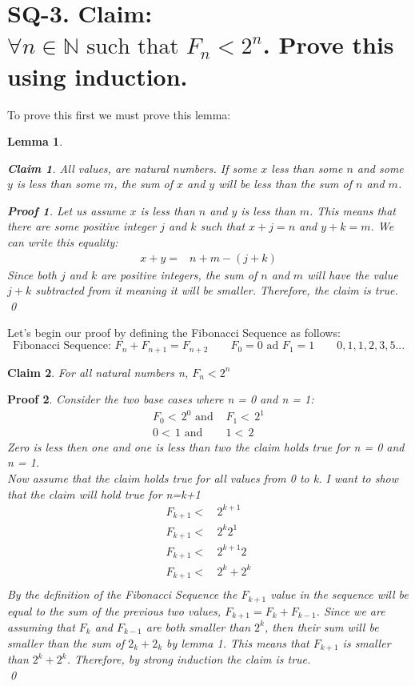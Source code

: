 \documentclass{article}
\newtheorem*{claim}{Claim}
\newtheorem{lemma}{Lemma}
\newtheorem*{poof}{Proof}
\begin{document}
\section*{SQ-3. Claim: $\forall n \in \mathbb{N} \text{ such that }F_n < 2^n$. Prove this using induction.}
To prove this first we must prove this lemma:
\begin{lemma}
    \begin{claim}
        All values, are natural numbers. If some $x$ less than some $n$ and some $y$ is less than some $m$, the sum of $x$ and $y$ will be less than the sum of $n$ and $m$.
    \end{claim}
    \begin{poof}
        Let us assume $x$ is less than $n$ and $y$ is less than $m$. This means that there are some positive integer $j$ and $k$ such that $x+j=n$ and $y+k=m$. We can write this equality:
        \begin{align*}
            x+y =& n+m-(j+k)
        \end{align*}
        Since both $j$ and $k$ are positive integers, the sum of $n$ and $m$ will have the value $j+k$ subtracted from it meaning it will be smaller. Therefore, the claim is true.\\
        \qed
    \end{poof}
\end{lemma}
Let's begin our proof by defining the Fibonacci Sequence as follows:
$$\text{Fibonacci Sequence: }F_n+F_{n+1}=F_{n+2}\qquad F_0 = 0 \text{ ad }F_1=1 \qquad 0,1,1,2,3,5...$$
\begin{claim}
    For all natural numbers n, $F_n < 2^n$
\end{claim}
\begin{poof}
    Consider the two base cases where n = 0 and n = 1:
    \begin{align*}
        F_0<\,2^0 \text{ and }& F_1<\,2^1\\
        0<\,1\text{ and }&1<\,2
    \end{align*}
    Zero is less then one and one is less than two the claim holds true for n = 0 and n = 1.
    \\
    \noindent Now assume that the claim holds true for all values from 0 to k. I want to show that the claim will hold true for n=k+1
    \begin{align*}
        F_{k+1}<&\,2^{k+1}\\
        F_{k+1}<&\,2^{k}2^1\\
        F_{k+1}<&\,2^{k+1}2\\
        F_{k+1}<&\,2^{k}+2^{k}\\
    \end{align*}
    By the definition of the Fibonacci Sequence the $F_{k+1}$ value in the sequence will be equal to the sum of the previous two values, $F_{k+1}=F_k+F_{k-1}$. Since we are assuming that $F_k$ and $F_{k-1}$ are both smaller than $2^k$, then their sum will be smaller than the sum of $2_k+2_k$ by lemma 1. This means that $F_{k+1}$ is smaller than $2^k+2^k$. Therefore, by strong induction the claim is true.\\
    \qed
\end{poof}
\end{document}
